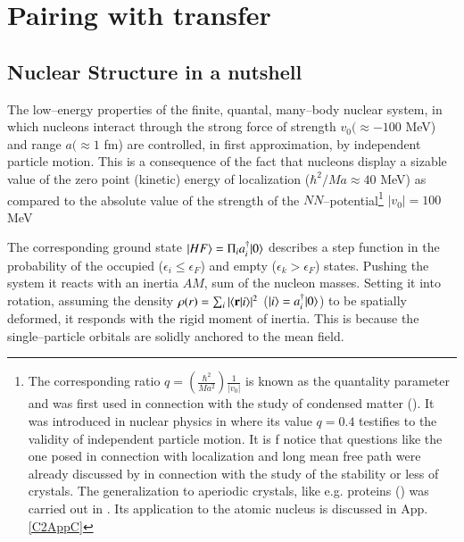 \chapter{Pairing with transfer}\label{chapter1}
\section{Nuclear Structure in a nutshell}\label{C1S1}
The low--energy properties of the finite, quantal, many--body nuclear system, in which nucleons interact through the strong force of strength $v_0(\approx -100$ MeV) and range $a(\approx 1$ fm) are controlled, in first approximation, by independent particle motion. This is a consequence of the fact that nucleons display a sizable value of the zero point (kinetic) energy of localization ($\hbar^2/Ma\approx 40$ MeV) as compared to the absolute value of the strength of the $NN$--potential\footnote{The corresponding ratio $q=\left(\frac{\hbar^2}{Ma^2}\right)\frac{1}{|v_0|}$ is known as the quantality parameter and was first used in connection with the study of condensed matter (\cite{deBoer:48,deBoer:57,deBoer:48b,Nosanow:76}). It was introduced in nuclear physics in \cite{Mottelson:02} where its value $q=0.4$ testifies to the validity of independent particle motion. It is f notice that questions like the one posed in connection with localization and long mean free path were already discussed by \cite{Lindemann:10} in connection with the study of the stability or less of crystals. The generalization to aperiodic crystals, like e.g. proteins (\cite{Schrodinger:44}) was carried out in \cite{Stillinger:90}. Its application to the atomic nucleus is discussed in App. \ref{C2AppC} } $|v_0|=100$ MeV 

The corresponding ground state $|{HF} \rangle=\Pi_ia^\dagger_i|{0} \rangle$ describes a step function in the probability of the occupied ($\epsilon_i\leq \epsilon_F$) and empty ($\epsilon_k>\epsilon_F$) states. Pushing the system it reacts with an inertia $AM$, sum of the nucleon masses. Setting it into rotation, assuming the density $\rho(r)=\sum_i|\langle {\mathbf r|i} \rangle|^2$ ($|{i} \rangle=a^\dagger_i|{0} \rangle$) to be spatially deformed, it responds with the rigid moment of inertia. This is because the single--particle orbitals are solidly anchored to the mean field.


